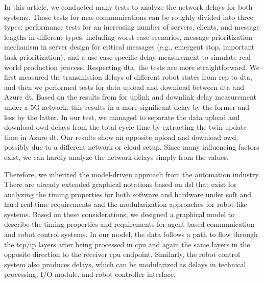In this article, we conducted many tests to analyze the network delays 
for both systems. Those tests for \gls{mas} communications can be roughly 
divided into three types: performance tests for an increasing number of servers, 
clients, and message lengths in different types, including worst-case scenarios, 
message prioritization mechanism in server design for critical messages 
(e.g., emergent stop, important task prioritization), and a use case specific 
delay measurement to simulate real-world production process. Respecting \gls{dta}, 
the tests are more straightforward. We first measured the transmission delays of 
different robot states from \gls{rcp} to \gls{dta}, and then we performed tests 
for data upload and download between \gls{dta} and Azure \gls{dt}. Based on the 
results from \cite{cainelli_performance_2023} for uplink and downlink delay measurement under a 5G 
network, this results in a more significant delay by the former and less by the 
latter. In our test, we managed to separate the data upload and download \gls{owd} 
delays from the total cycle time by extracting the twin update time in 
Azure \gls{dt}. Our results show an opposite upload and download \gls{owd}, 
possibly due to a different network or cloud setup. Since many influencing 
factors exist, we can hardly analyze the network delays simply from the values. 



Therefore, we inherited the model-driven approach from the automation industry. 
There are already extended graphical notations based on \gls{dsl} that exist 
for analyzing the timing properties for both software and hardware under soft 
and hard real-time requirements\cite{hujo_toward_2022} and the modularization 
approaches for robot-like systems\cite{volpert_supporting_nodate}. Based on these 
considerations, we designed a graphical model to describe the timing properties 
and requirements for agent-based communication and robot control systems. 
In our model, the data follows a path to flow through the \gls{tcp/ip} layers 
after being processed in \gls{cpu} and again the same layers in the opposite 
direction to the receiver \gls{cpu} endpoint. Similarly, the robot control system 
also produces delays, which can be modularized as delays in technical processing, 
I/O module, and robot controller interface. 
